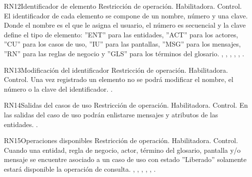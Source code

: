 \begin{BussinesRule}{RN12}{Identificador de elemento} 
	\BRitem[Tipo:] Restricción de operación. 
	\BRitem[Clase:] Habilitadora. 
	\BRitem[Nivel:] Control. %
	\BRitem[Descripción:] El identificador de cada elemento se compone de un nombre, número y una clave. Donde el nombre es el que le asigna el usuario, el número es secuencial y la clave define el tipo de elemento: ''ENT'' para las entidades, ''ACT'' para los actores, ''CU'' para los casos de uso, ''IU'' para las pantallas, ''MSG'' para los mensajes, ''RN'' para las reglas de negocio y ''GLS'' para los términos del glosario.
	 , , , , , . 
\end{BussinesRule}

\begin{BussinesRule}{RN13}{Modificación del identificador} 
	\BRitem[Tipo:] Restricción de operación. 
	\BRitem[Clase:] Habilitadora. 
	\BRitem[Nivel:] Control. %
	\BRitem[Descripción:] Una vez registrado un elemento no se podrá modificar el nombre, el número o la clave del identificador.
	 \UCref{}{}. 
\end{BussinesRule}

\begin{BussinesRule}{RN14}{Salidas del casos de uso} 
	\BRitem[Tipo:] Restricción de operación. 
	\BRitem[Clase:] Habilitadora. 
	\BRitem[Nivel:] Control. %
	\BRitem[Descripción:] En las salidas del caso de uso podrán enlistarse mensajes y atributos de las entidades.
	 \UCref{}{}. 
\end{BussinesRule}

\begin{BussinesRule}{RN15}{Operaciones disponibles} 
	\BRitem[Tipo:] Restricción de operación. 
	\BRitem[Clase:] Habilitadora. 
	\BRitem[Nivel:] Control. %
	\BRitem[Descripción:] Cuando una entidad, regla de negocio, actor, término del glosario, pantalla y/o mensaje se encuentre asociado a un caso de uso con estado ''Liberado'' solamente estará disponible la operación de consulta.
	 , , , , , . 
\end{BussinesRule}

